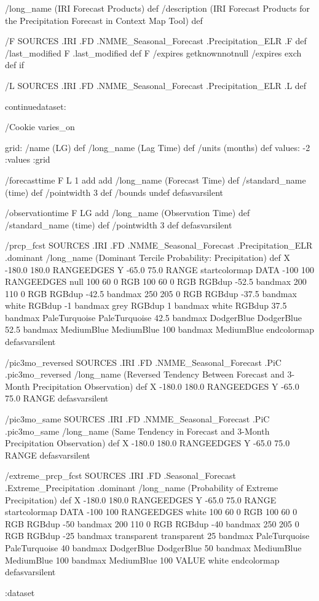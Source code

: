 \begin{ingrid}

/long_name (IRI Forecast Products) def
/description (IRI Forecast Products for the Precipitation Forecast in Context Map Tool) def

/F SOURCES .IRI .FD .NMME_Seasonal_Forecast .Precipitation_ELR .F def
/last_modified F .last_modified def
F /expires getknownnotnull { /expires exch def } if

/L SOURCES .IRI .FD .NMME_Seasonal_Forecast .Precipitation_ELR .L def

continuedataset:

/Cookie varies_on

grid:
/name (LG) def
/long_name (Lag Time) def
/units (months) def
values: -2 :values
:grid

/forecasttime {F L 1 add add /long_name (Forecast Time) def /standard_name (time) def /pointwidth 3 def
/bounds undef
} defasvarsilent

/observationtime { F LG add /long_name (Observation Time) def /standard_name (time) def /pointwidth 3 def } defasvarsilent

/prcp_fcst { SOURCES .IRI .FD .NMME_Seasonal_Forecast .Precipitation_ELR .dominant
 /long_name (Dominant Tercile Probability:  Precipitation) def
 X -180.0 180.0 RANGEEDGES
 Y -65.0 75.0 RANGE
startcolormap
DATA -100 100 RANGEEDGES
null 100 60 0 RGB
100 60 0 RGB RGBdup -52.5 bandmax
200 110 0 RGB RGBdup -42.5 bandmax
250 205 0 RGB RGBdup -37.5 bandmax
white RGBdup -1 bandmax
grey RGBdup 1 bandmax
white RGBdup 37.5 bandmax
PaleTurquoise PaleTurquoise 42.5 bandmax
DodgerBlue DodgerBlue 52.5 bandmax
MediumBlue MediumBlue 100 bandmax
MediumBlue
endcolormap
} defasvarsilent

/pic3mo_reversed { 
 SOURCES .IRI .FD .NMME_Seasonal_Forecast .PiC .pic3mo_reversed
 /long_name (Reversed Tendency Between Forecast and 3-Month Precipitation Observation) def
 X -180.0 180.0 RANGEEDGES
 Y -65.0 75.0 RANGE
} defasvarsilent

/pic3mo_same { 
 SOURCES .IRI .FD .NMME_Seasonal_Forecast .PiC .pic3mo_same 
 /long_name (Same Tendency in Forecast and 3-Month Precipitation Observation) def
 X -180.0 180.0 RANGEEDGES
 Y -65.0 75.0 RANGE
} defasvarsilent

/extreme_prcp_fcst { SOURCES .IRI .FD .Seasonal_Forecast .Extreme_Precipitation .dominant
 /long_name (Probability of Extreme Precipitation) def
 X -180.0 180.0 RANGEEDGES
 Y -65.0 75.0 RANGE
 startcolormap
 DATA -100 100 RANGEEDGES
 white 100 60 0 RGB
 100 60 0 RGB RGBdup -50 bandmax
 200 110 0 RGB RGBdup -40 bandmax
 250 205 0 RGB RGBdup -25 bandmax
 transparent transparent 25 bandmax
 PaleTurquoise PaleTurquoise 40 bandmax
 DodgerBlue DodgerBlue 50 bandmax
 MediumBlue MediumBlue 100 bandmax
 MediumBlue 100 VALUE
 white
 endcolormap
} defasvarsilent

:dataset
\end{ingrid}
